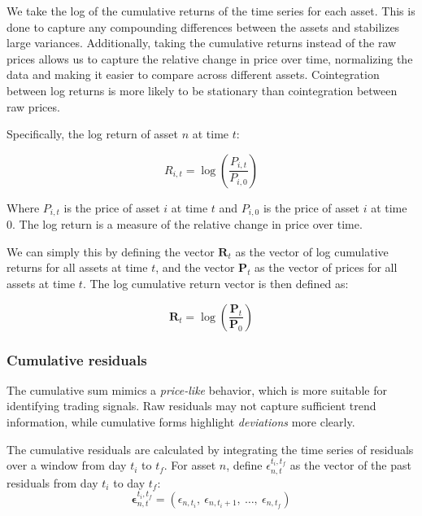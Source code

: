 \documentclass[12pt]{article}
\begin{document}
We take the log of the cumulative returns of the time series for each asset. This is done to capture any compounding differences between the assets and stabilizes large variances. Additionally, taking the cumulative returns instead of the raw prices allows us to capture the relative change in price over time, normalizing the data and making it easier to compare across different assets. Cointegration between log returns is more likely to be stationary than cointegration between raw prices.

Specifically, the log return of asset $n$ at time $t$:

\begin{equation}
    R_{i,t} = \log\left( \frac{P_{i,t}}{P_{i,0}} \right)
    \label{eq:log_cumulative_return}
\end{equation}

Where $P_{i,t}$ is the price of asset $i$ at time $t$ and $P_{i,0}$ is the price of asset $i$ at time $0$. The log return is a measure of the relative change in price over time.

We can simply this by defining the vector $\mathbf{R}_t$ as the vector of log cumulative returns for all assets at time $t$, and the vector $\mathbf{P}_t$ as the vector of prices for all assets at time $t$. The log cumulative return vector is then defined as:

\begin{equation}
    \mathbf{R}_t = \log\left( \frac{\mathbf{P}_t}{\mathbf{P}_0} \right)
    \label{eq:log_cumulative_return_vector}
\end{equation}

\subsubsection{Cumulative residuals}

The cumulative sum mimics a \textit{price-like} behavior, which is more suitable for identifying trading signals. Raw residuals may not capture sufficient trend information, while cumulative forms highlight \textit{deviations} more clearly.

The cumulative residuals are calculated by integrating the time series of residuals over a window from day $t_{i}$ to $t_{f}$. For asset $n$, define $\epsilon^{t_i,t_f}_{n,t}$ as the vector of the past residuals from day $t_{i}$ to day $t_{f}$:
\begin{equation}
    \mathbf{\epsilon}^{t_i,t_f}_{n,t} = \left( \epsilon_{n,t_i},\ \epsilon_{n,t_i+1},\ \ldots,\ \epsilon_{n,t_f} \right)
    \label{eq:residual_vector}
\end{equation}
\end{document}
